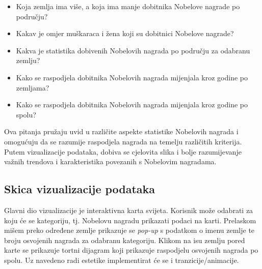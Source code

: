 \documentclass[12pt]{article}
\numberwithin{equation}{section}
\begin{document}
\begin{itemize}
\item Koja zemlja ima više, a koja ima manje dobitnika Nobelove nagrade po području?
\item Kakav je omjer muškaraca i žena koji su dobitnici Nobelove nagrade?
\item Kakva je statistika dobivenih Nobelovih nagrada po području za odabranu zemlju?
\item Kako se raspodjela dobitnika Nobelovih nagrada mijenjala kroz godine po zemljama?
\item Kako se raspodjela dobitnika Nobelovih nagrada mijenjala kroz godine po spolu?
\end{itemize}
Ova pitanja pružaju uvid u različite aspekte statistike Nobelovih nagrada i omogućuju da se razumije raspodjela nagrada na temelju različitih kriterija. Putem vizualizacije podataka, dobiva se cjelovita slika i bolje razumijevanje važnih trendova i karakteristika povezanih s Nobelovim nagradama.
\subsection{Skica vizualizacije podataka}
Glavni dio vizualizacije je interaktivna karta svijeta. Korisnik može odabrati za koju će se kategoriju, tj. Nobelovu nagradu prikazati podaci na karti. Prelaskom mišem preko određene zemlje prikazuje se \textit{pop-up} s podatkom o imenu zemlje te broju osvojenih nagrada za odabranu kategoriju. Klikom na isu zemlju pored karte se prikazuje tortni dijagram koji prikazuje raspodjelu osvojenih nagrada po spolu. Uz navedeno radi estetike implementirat će se i tranzicije/animacije.
\end{document}
